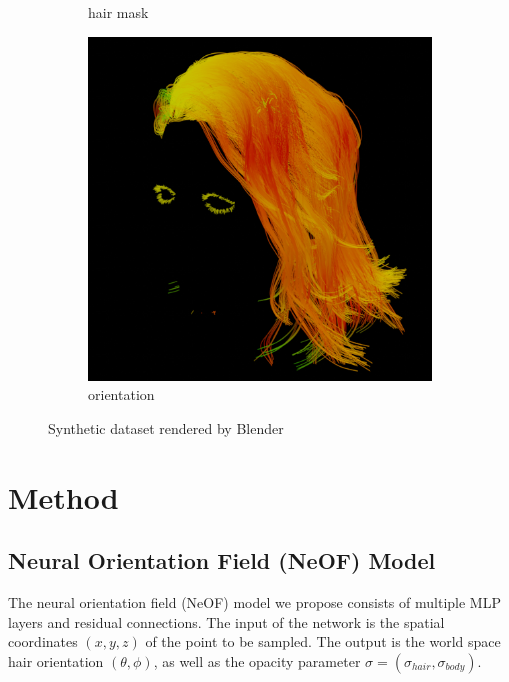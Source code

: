 \documentclass{article}
\begin{document}
\begin{figure}[h]
\begin{subfigure}{0.24\linewidth}
		\caption{hair mask}
	\end{subfigure}
	\hfill
	\begin{subfigure}{0.24\linewidth}
        \centering
        \includegraphics[width=\textwidth]{./images/dataset/0009_hairdir.png}
        \caption{orientation}
	\end{subfigure}

	\caption{Synthetic dataset rendered by Blender}
	\label{fig:dataset}
\end{figure}

\section{Method}


\subsection{Neural Orientation Field (NeOF) Model}

The neural orientation field (NeOF) model we propose consists of multiple MLP layers and residual connections. The input of the network is the spatial coordinates $(x, y, z)$ of the point to be sampled. The output is the world space hair orientation $(\theta, \phi)$, as well as the opacity parameter $\sigma = (\sigma_{hair}, \sigma_{body})$.
\end{document}
